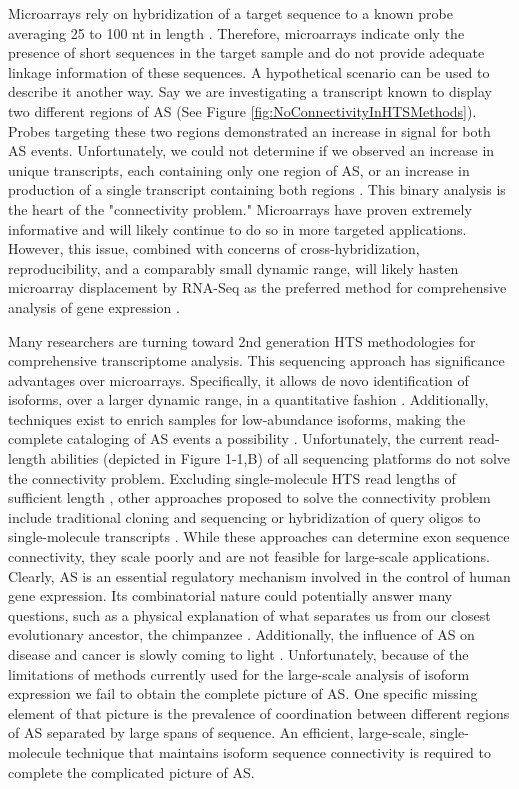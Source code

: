 Microarrays rely on hybridization of a target sequence to a known probe averaging 25 to 100 nt in length \citep{Southern2001}. Therefore, microarrays indicate only the presence of short sequences in the target sample and do not provide adequate linkage information of these sequences. A hypothetical scenario can be used to describe it another way. Say we are investigating a transcript known to display two different regions of AS (See Figure \ref{fig:NoConnectivityInHTSMethods}). Probes targeting these two regions demonstrated an increase in signal for both AS events. Unfortunately, we could not determine if we observed an increase in unique transcripts, each containing only one region of AS, or an increase in production of a single transcript containing both regions \citep{Calarco2007}. This binary analysis is the heart of the "connectivity problem." Microarrays have proven extremely informative and will likely continue to do so in more targeted applications. However, this issue, combined with concerns of cross-hybridization, reproducibility, and a comparably small dynamic range, will likely hasten microarray displacement by RNA-Seq as the preferred method for comprehensive analysis of gene expression \citep{Shendure2008}.

Many researchers are turning toward 2nd generation HTS methodologies for comprehensive transcriptome analysis. This sequencing approach has significance advantages over microarrays. Specifically, it allows de novo identification of isoforms, over a larger dynamic range, in a quantitative fashion \citep{Mortazavi2008}. Additionally, techniques exist to enrich samples for low-abundance isoforms, making the complete cataloging of AS events a possibility \citep{Djebali2008, Salehi-Ashtiani2008}. Unfortunately, the current read-length abilities (depicted in Figure 1-1,B) of all sequencing platforms do not solve the connectivity problem. Excluding single-molecule HTS read lengths of sufficient length \citep{Shendure2004}, other approaches proposed to solve the connectivity problem include traditional cloning and sequencing or hybridization of query oligos to single-molecule transcripts \citep{Zhu2003, Calarco2007, Emerick2007}. While these approaches can determine exon sequence connectivity, they scale poorly and are not feasible for large-scale applications. 
Clearly, AS is an essential regulatory mechanism involved in the control of human gene expression. Its combinatorial nature could potentially answer many questions, such as a physical explanation of what separates us from our closest evolutionary ancestor, the chimpanzee \citep{Calarco2007a}. Additionally, the influence of AS on disease and cancer is slowly coming to light \citep{Tazi2009}. Unfortunately, because of the limitations of methods currently used for the large-scale analysis of isoform expression we fail to obtain the complete picture of AS. One specific missing element of that picture is the prevalence of coordination between different regions of AS separated by large spans of sequence. An efficient, large-scale, single-molecule technique that maintains isoform sequence connectivity is required to complete the complicated picture of AS.

